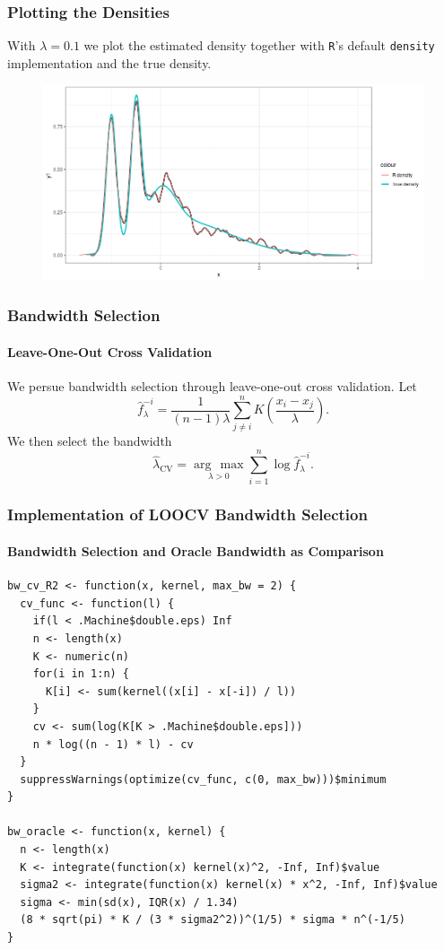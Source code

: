 \documentclass[aspectratio=169]{beamer}
\begin{document}
\begin{frame}
  \frametitle{Plotting the Densities}
  With $\lambda = 0.1$ we plot the estimated density together with \texttt{R}'s default \texttt{density} implementation and the true density.
  \begin{figure}
    \centering
    \includegraphics[scale = 0.4]{figure/FirstTest.png}
  \end{figure} 
\end{frame}
\begin{frame}
  \frametitle{Bandwidth Selection}
  \framesubtitle{Leave-One-Out Cross Validation}  
  We persue bandwidth selection through leave-one-out cross validation. Let
  \begin{equation}
    \hat{f}^{-i}_{\lambda}=\frac{1}{(n-1)\lambda}\sum_{j\neq i}^{n}K\left(\frac{x_{i}-x_{j}}{\lambda}\right).
  \end{equation}
  We then select the bandwidth
  \begin{equation}
    \hat{\lambda}_{\text{CV}}=\underset{\lambda > 0}{\arg\,\max}\sum_{i=1}^{n}\log\hat{f}^{-i}_{\lambda}.
  \end{equation}
\end{frame}
\begin{frame}[fragile]
  \frametitle{Implementation of LOOCV Bandwidth Selection}
  \framesubtitle{Bandwidth Selection and Oracle Bandwidth as Comparison}
\begin{verbatim}
bw_cv_R2 <- function(x, kernel, max_bw = 2) {
  cv_func <- function(l) {
    if(l < .Machine$double.eps) Inf
    n <- length(x)
    K <- numeric(n)
    for(i in 1:n) {
      K[i] <- sum(kernel((x[i] - x[-i]) / l))
    }
    cv <- sum(log(K[K > .Machine$double.eps]))
    n * log((n - 1) * l) - cv
  }
  suppressWarnings(optimize(cv_func, c(0, max_bw)))$minimum
}

bw_oracle <- function(x, kernel) {
  n <- length(x)
  K <- integrate(function(x) kernel(x)^2, -Inf, Inf)$value
  sigma2 <- integrate(function(x) kernel(x) * x^2, -Inf, Inf)$value
  sigma <- min(sd(x), IQR(x) / 1.34)
  (8 * sqrt(pi) * K / (3 * sigma2^2))^(1/5) * sigma * n^(-1/5)
}
\end{verbatim}
\end{frame}
\end{document}
